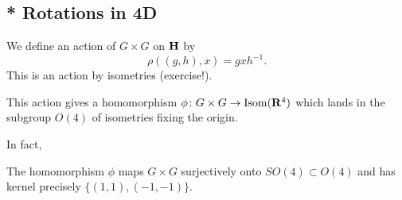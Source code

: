 \documentclass[12pt]{article}
\begin{document}
\subsection{* Rotations in 4D}

\begin{dfn}
  We define an action of $G\times G$ on $\mathbf{H}$ by
  \[\rho((g,h),x)=gxh^{-1}.\]
  This is an action by isometries (exercise!).
\end{dfn}

\begin{rmk}
  This action gives a homomorphism $\phi\colon G\times G\to\operatorname{Isom}(\mathbf{R}^4)$ which lands in the subgroup $O(4)$ of isometries fixing the origin.
\end{rmk}

In fact,

\begin{thm}
   The homomorphism $\phi$ maps $G\times G$ surjectively onto $SO(4)\subset O(4)$ and has kernel precisely $\{(1,1),(-1,-1)\}$.
\end{thm}
\end{document}
